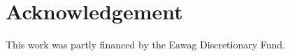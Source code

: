 \documentclass[11pt]{article}
\theoremstyle{definition}
\begin{document}



\section*{Acknowledgement}
This work was partly financed by the Eawag Discretionary Fund.




\end{document}
